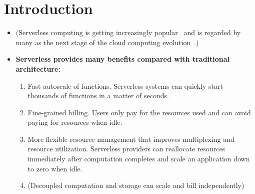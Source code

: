\section{Introduction}

\begin{itemize}

  \item (Serverless computing is getting increasingly
  popular~\cite{datadog-state-of-serverless} and is regarded by many as the
  next stage of the cloud computing evolution~\cite{berkeley}.)


  \item \textbf{Serverless provides many benefits compared with traditional
  architecture: }

    \begin{enumerate}

      \item Fast autoscale of functions. Serverless systems can quickly start
      thousands of functions in a matter of seconds.


      \item Fine-grained billing. Users only pay for the resources used and
      can avoid paying for resources when idle.

      \item More flexible resource management that improves multiplexing and
      resource utilization. Serverless providers can reallocate resources
      immediately after computation completes and scale an application down to
      zero when idle.

      \item (Decoupled computation and storage can scale and bill
      independently)




\end{enumerate}
\end{itemize}
